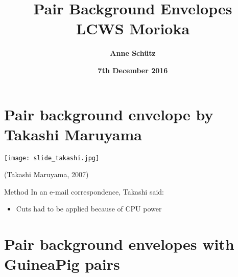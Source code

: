 \documentclass[xcolor={dvipsnames}]{beamer}
\title[ILC \& Muons from spoilers]{\textbf{\LARGE Pair Background Envelopes} \\ \vspace*{0.3cm} \small LCWS Morioka}
\author[Anne Sch\"utz]{\textbf{Anne Sch\"utz}}
\institute{\textbf{DESY}}
\date{\textbf{7th December 2016}}
\begin{document}
{
\begin{frame}
  \titlepage
\end{frame}
}
\begin{frame}
  \tableofcontents
\end{frame}

\section{Pair background envelope by Takashi Maruyama}
\begin{frame}
\begin{center}
  \texttt{[image: slide\_takashi.jpg]}
\end{center}
 \begin{flushright} 
  (Takashi Maruyama, 2007)
 \end{flushright}
\end{frame}
\begin{frame}{Method}
 In an e-mail correspondence, Takashi said:
 \begin{itemize}
 \item Cuts had to be applied because of CPU power
\end{itemize}
\end{frame}

\section{Pair background envelopes with GuineaPig pairs}
\end{document}
